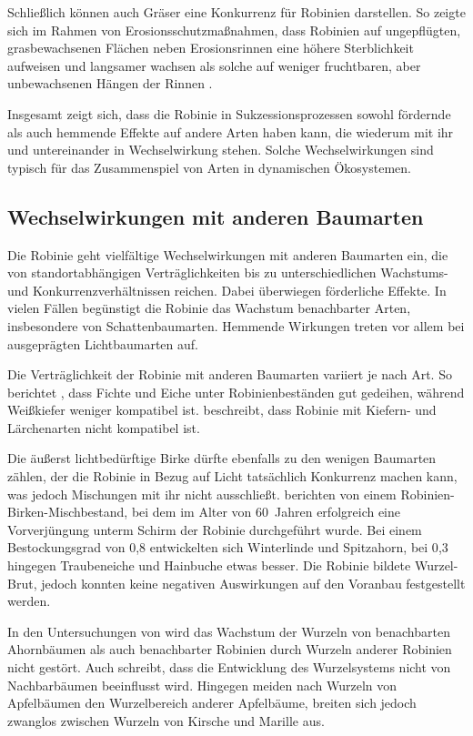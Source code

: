 \documentclass[twocolumn]{scrartcl}
\begin{document}
Schließlich können auch Gräser eine Konkurrenz für Robinien
darstellen. So zeigte sich im Rahmen von Erosionsschutzmaßnahmen, dass
Robinien auf ungepflügten, grasbewachsenen Flächen neben
Erosionsrinnen eine höhere Sterblichkeit aufweisen und langsamer
wachsen als solche auf weniger fruchtbaren, aber unbewachsenen Hängen
der Rinnen \citep{meginnis1934robinie, cooper1950blacklocust}.

Insgesamt zeigt sich, dass die Robinie in Sukzessionsprozessen sowohl
fördernde als auch hemmende Effekte auf andere Arten haben kann, die
wiederum mit ihr und untereinander in Wechselwirkung stehen. Solche
Wechselwirkungen sind typisch für das Zusammenspiel von Arten in
dynamischen Ökosystemen.


\subsection{Wechselwirkungen mit anderen Baumarten}

Die Robinie geht vielfältige Wechselwirkungen mit anderen Baumarten
ein, die von standortabhängigen Verträglichkeiten bis zu
unterschiedlichen Wachstums- und Konkurrenzverhältnissen
reichen. Dabei überwiegen förderliche Effekte. In vielen Fällen
begünstigt die Robinie das Wachstum benachbarter Arten, insbesondere
von Schattenbaumarten. Hemmende Wirkungen treten vor allem bei
ausgeprägten Lichtbaumarten auf.

Die Verträglichkeit der Robinie mit anderen Baumarten variiert je nach
Art. So berichtet \citet[S.~138]{krauss1986sauenerWald}, dass Fichte
und Eiche unter Robinienbeständen gut gedeihen, während Weißkiefer
weniger kompatibel ist. \citet{kellog1934robinieMischbestand}
beschreibt, dass Robinie mit Kiefern- und Lärchenarten nicht
kompatibel ist.

Die äußerst lichtbedürftige Birke dürfte ebenfalls zu den wenigen
Baumarten zählen, der die Robinie in Bezug auf Licht tatsächlich
Konkurrenz machen kann, was jedoch Mischungen mit ihr nicht
ausschließt. \citet{gaier2009robinieVorverjuengung} berichten von
einem Robinien-Birken-Mischbestand, bei dem im Alter von 60~Jahren
erfolgreich eine Vorverjüngung unterm Schirm der Robinie durchgeführt
wurde. Bei einem Bestockungsgrad von 0{,}8 entwickelten sich
Winterlinde und Spitzahorn, bei 0{,}3 hingegen Traubeneiche und
Hainbuche etwas besser. Die Robinie bildete Wurzel-Brut, jedoch
konnten keine negativen Auswirkungen auf den Voranbau festgestellt
werden.

In den Untersuchungen von
\citet[S.~150--160]{scamoni1952robinieWurzeln} wird das Wachstum der
Wurzeln von benachbarten Ahornbäumen als auch benachbarter Robinien
durch Wurzeln anderer Robinien nicht gestört. Auch
\citet{bencat1992robinie} schreibt, dass die Entwicklung des
Wurzelsystems nicht von Nachbarbäumen beeinflusst wird. Hingegen
meiden nach \citet[S.~53]{kolesnikov1971wurzeln} Wurzeln von
Apfelbäumen den Wurzelbereich anderer Apfelbäume, breiten sich jedoch
zwanglos zwischen Wurzeln von Kirsche und Marille aus.
\end{document}
